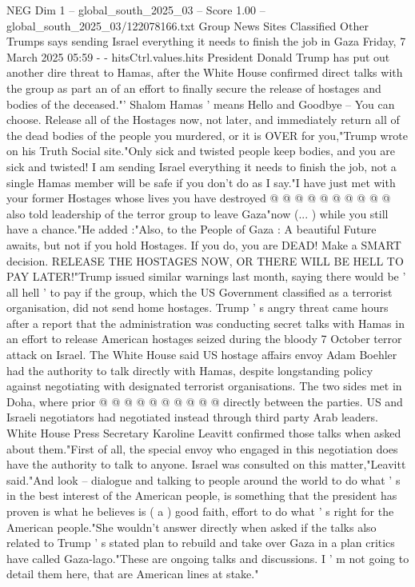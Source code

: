 \begin{textsample}{NEG Dim 1 – global\_south\_2025\_03 – Score 1.00 – global\_south\_2025\_03/122078166.txt}  \label{ex:f1_neg_184}
Group News Sites Classified Other Trumps says sending Israel everything it needs to finish the job in Gaza Friday, 7 March 2025 05:59 - - hitsCtrl.values.hits President Donald Trump has put out another dire threat to Hamas, after the White House confirmed direct talks with the group as part an of an effort to finally secure the release of hostages and bodies of the deceased."' Shalom Hamas ' means Hello and Goodbye -- You can choose.
Release all of the Hostages now, not later, and immediately return all of the dead bodies of the people you murdered, or it is OVER for you,"Trump wrote on his Truth Social site."Only sick and twisted people keep bodies, and you are sick and twisted!
I am sending Israel everything it needs to finish the job, not a single Hamas member will be safe if you don't do as I say."I have just met with your former Hostages whose lives you have destroyed @ @ @ @ @ @ @ @ @ @ also told leadership of the terror group to leave Gaza"now (... ) while you still have a chance."He added :"Also, to the People of Gaza : A beautiful Future awaits, but not if you hold Hostages.
If you do, you are DEAD!
Make a SMART decision.
RELEASE THE HOSTAGES NOW, OR THERE WILL BE HELL TO PAY LATER!"Trump issued similar warnings last month, saying there would be ' all hell ' to pay if the group, which the US Government classified as a terrorist organisation, did not send home hostages.
Trump ' s angry threat came hours after a report that the administration was conducting secret talks with Hamas in an effort to release American hostages seized during the bloody 7 October terror attack on Israel.
The White House said US hostage affairs envoy Adam Boehler had the authority to talk directly with Hamas, despite longstanding policy against negotiating with designated terrorist organisations.
The two sides met in Doha, where prior @ @ @ @ @ @ @ @ @ @ directly between the parties.
US and Israeli negotiators had negotiated instead through third party Arab leaders.
White House Press Secretary Karoline Leavitt confirmed those talks when asked about them."First of all, the special envoy who engaged in this negotiation does have the authority to talk to anyone.
Israel was consulted on this matter,"Leavitt said."And look -- dialogue and talking to people around the world to do what ' s in the best interest of the American people, is something that the president has proven is what he believes is ( a ) good faith, effort to do what ' s right for the American people."She wouldn't answer directly when asked if the talks also related to Trump ' s stated plan to rebuild and take over Gaza in a plan critics have called Gaza-lago."These are ongoing talks and discussions.
I ' m not going to detail them here, that are American lines at stake."

\end{textsample}
